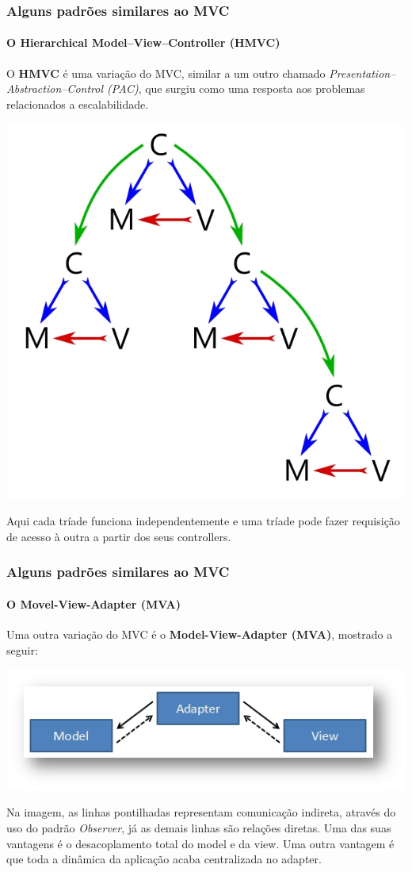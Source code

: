 \documentclass{beamer}
\begin{document}
\begin{frame}
\frametitle{Alguns padrões similares ao MVC}
\framesubtitle{O Hierarchical Model–View–Controller (HMVC)}
	O \textbf{HMVC} é uma variação do MVC, similar a um outro chamado \textit{Presentation–Abstraction–Control (PAC)}, que surgiu como uma resposta aos problemas
	relacionados a escalabilidade.
	\begin{center}
		\includegraphics[scale=0.125]{HMVC.jpg}
	\end{center}
	Aqui cada tríade funciona independentemente e uma tríade pode fazer requisição de acesso à outra a partir dos seus controllers.
\end{frame}

\begin{frame}
\frametitle{Alguns padrões similares ao MVC}
\framesubtitle{O Movel-View-Adapter (MVA)}
	Uma outra variação do MVC é o \textbf{Model-View-Adapter (MVA)}, mostrado a seguir:
	\begin{center}
		\includegraphics[scale=0.4]{MVA.jpg}
	\end{center}
	Na imagem, as linhas pontilhadas representam comunicação indireta, através do uso do padrão \textit{Observer}, já as demais linhas são relações diretas.
	Uma das suas vantagens é o desacoplamento total do model e da view. Uma outra vantagem é que toda a dinâmica da aplicação acaba centralizada no adapter.
\end{frame}
\end{document}
